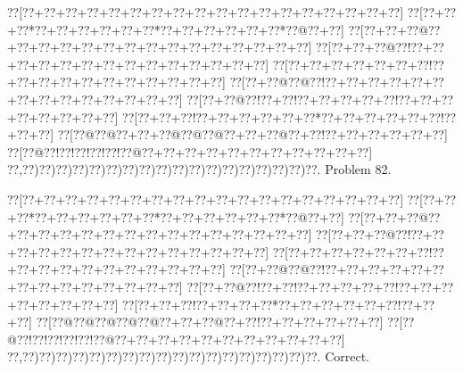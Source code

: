 \documentclass[a5paper]{article}
\begin{document}
\begin{center}
{\goo
\0??[\0??+\0??+\0??+\0??+\0??+\0??+\0??+\0??+\0??+\0??+\0??+\0??+\0??+\0??+\0??+\0??+\0??+\0??]
\0??[\0??+\0??+\0??*\0??+\0??+\0??+\0??+\0??+\0??*\0??+\0??+\0??+\0??+\0??+\0??*\0??@\0??+\0??]
\0??[\0??+\0??+\0??@\0??+\0??+\0??+\0??+\0??+\0??+\0??+\0??+\0??+\0??+\0??+\0??+\0??+\0??+\0??]
\0??[\0??+\0??+\0??@\0??!\0??+\0??+\0??+\0??+\0??+\0??+\0??+\0??+\0??+\0??+\0??+\0??+\0??+\0??]
\0??[\0??+\0??+\0??+\0??+\0??+\0??+\0??!\0??+\0??+\0??+\0??+\0??+\0??+\0??+\0??+\0??+\0??+\0??]
\0??[\0??+\0??@\0??@\0??!\0??+\0??+\0??+\0??+\0??+\0??+\0??+\0??+\0??+\0??+\0??+\0??+\0??+\0??]
\0??[\0??+\0??@\0??!\0??+\0??!\0??+\0??+\0??+\0??+\0??!\0??+\0??+\0??+\0??+\0??+\0??+\0??+\0??]
\0??[\0??+\0??+\0??!\0??+\0??+\0??+\0??+\0??+\0??*\0??+\0??+\0??+\0??+\0??+\0??!\0??+\0??+\0??]
\0??[\0??@\0??@\0??+\0??+\0??@\0??@\0??@\0??+\0??+\0??@\0??+\0??!\0??+\0??+\0??+\0??+\0??+\0??]
\0??[\0??@\0??!\0??!\0??!\0??!\0??!\0??@\0??+\0??+\0??+\0??+\0??+\0??+\0??+\0??+\0??+\0??+\0??]
\0??,\0??)\0??)\0??)\0??)\0??)\0??)\0??)\0??)\0??)\0??)\0??)\0??)\0??)\0??)\0??)\0??)\0??)\0??.
}
Problem 82.

\end{center}
\begin{center}
{\goo
\0??[\0??+\0??+\0??+\0??+\0??+\0??+\0??+\0??+\0??+\0??+\0??+\0??+\0??+\0??+\0??+\0??+\0??+\0??]
\0??[\0??+\0??+\0??*\0??+\0??+\0??+\0??+\0??+\0??*\0??+\0??+\0??+\0??+\0??+\0??*\0??@\0??+\0??]
\0??[\0??+\0??+\0??@\0??+\0??+\0??+\0??+\0??+\0??+\0??+\0??+\0??+\0??+\0??+\0??+\0??+\0??+\0??]
\0??[\0??+\0??+\0??@\0??!\0??+\0??+\0??+\0??+\0??+\0??+\0??+\0??+\0??+\0??+\0??+\0??+\0??+\0??]
\0??[\0??+\0??+\0??+\0??+\0??+\0??+\0??!\0??+\0??+\0??+\0??+\0??+\0??+\0??+\0??+\0??+\0??+\0??]
\0??[\0??+\0??@\0??@\0??!\0??+\0??+\0??+\0??+\0??+\0??+\0??+\0??+\0??+\0??+\0??+\0??+\0??+\0??]
\0??[\0??+\0??@\0??!\0??+\0??!\0??+\0??+\0??+\0??+\0??!\0??+\0??+\0??+\0??+\0??+\0??+\0??+\0??]
\0??[\0??+\0??+\0??!\0??+\0??+\0??+\0??*\0??+\0??+\0??+\0??+\0??+\0??!\0??+\0??+\0??]
\0??[\0??@\0??@\0??@\0??@\0??@\0??+\0??+\0??@\0??+\0??!\0??+\0??+\0??+\0??+\0??+\0??]
\0??[\0??@\0??!\0??!\0??!\0??!\0??!\0??@\0??+\0??+\0??+\0??+\0??+\0??+\0??+\0??+\0??+\0??+\0??]
\0??,\0??)\0??)\0??)\0??)\0??)\0??)\0??)\0??)\0??)\0??)\0??)\0??)\0??)\0??)\0??)\0??)\0??)\0??.
}
Correct. 

\end{center}
\end{document}
